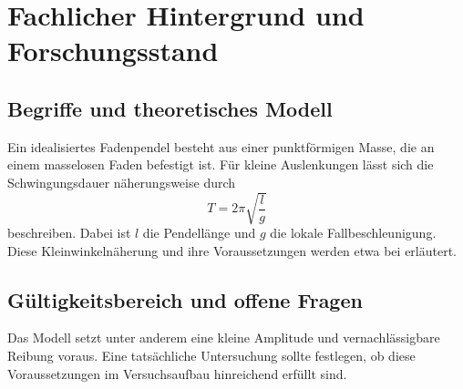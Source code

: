 \chapter{Fachlicher Hintergrund und Forschungsstand}
\label{ch:theorie}

\section{Begriffe und theoretisches Modell}
Ein idealisiertes Fadenpendel besteht aus einer punktförmigen Masse,
die an einem masselosen Faden befestigt ist. Für kleine Auslenkungen
lässt sich die Schwingungsdauer näherungsweise durch
\begin{equation}
  \label{eq:pendel}
  T = 2\pi\sqrt{\frac{l}{g}}
\end{equation}
beschreiben. Dabei ist \(l\) die Pendellänge und \(g\) die lokale
Fallbeschleunigung. Diese Kleinwinkelnäherung und ihre Voraussetzungen
werden etwa bei \textcite{openstax-pendel} erläutert.

\section{Gültigkeitsbereich und offene Fragen}
Das Modell setzt unter anderem eine kleine Amplitude und vernachlässigbare
Reibung voraus. Eine tatsächliche Untersuchung sollte festlegen, ob
diese Voraussetzungen im Versuchsaufbau hinreichend erfüllt sind.
